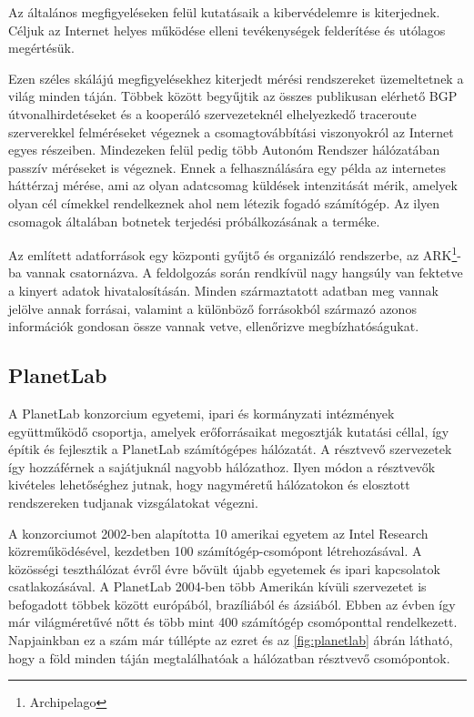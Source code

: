Az általános megfigyeléseken felül kutatásaik a kibervédelemre is kiterjednek. Céljuk az Internet helyes működése elleni tevékenységek felderítése és utólagos megértésük.


Ezen széles skálájú megfigyelésekhez kiterjedt mérési rendszereket üzemeltetnek a világ minden táján. Többek között begyűjtik az összes publikusan elérhető BGP útvonalhirdetéseket és a kooperáló szervezeteknél elhelyezkedő traceroute szerverekkel felméréseket végeznek a csomagtovábbítási viszonyokról az Internet egyes részeiben. Mindezeken felül pedig több Autonóm Rendszer hálózatában passzív méréseket is végeznek. Ennek a felhasználására egy példa az internetes háttérzaj mérése, ami az olyan adatcsomag küldések intenzitását mérik, amelyek olyan cél címekkel rendelkeznek ahol nem létezik fogadó számítógép. Az ilyen csomagok általában botnetek terjedési próbálkozásának a terméke.

Az említett adatforrások egy központi gyűjtő és organizáló rendszerbe, az ARK\footnote{Archipelago}-ba vannak csatornázva. A feldolgozás során rendkívül nagy hangsúly van fektetve a kinyert adatok hivatalosításán. Minden származtatott adatban meg vannak jelölve annak forrásai, valamint a különböző forrásokból származó azonos információk gondosan össze vannak vetve, ellenőrizve megbízhatóságukat.





\subsection{PlanetLab}

A PlanetLab konzorcium egyetemi, ipari és kormányzati intézmények együttműködő csoportja, amelyek erőforrásaikat megosztják kutatási céllal, így építik és fejlesztik a PlanetLab számítógépes hálózatát. A résztvevő szervezetek így hozzáférnek a sajátjuknál nagyobb hálózathoz. Ilyen módon a résztvevők kivételes lehetőséghez jutnak, hogy  nagyméretű hálózatokon és elosztott rendszereken tudjanak vizsgálatokat végezni.

A konzorciumot 2002-ben alapította 10 amerikai egyetem az Intel Research közreműködésével, kezdetben 100 számítógép-csomópont létrehozásával. A közösségi teszthálózat évről évre bővült újabb egyetemek és ipari kapcsolatok csatlakozásával. A PlanetLab 2004-ben több Amerikán kívüli szervezetet is befogadott többek között európából, brazíliából és ázsiából. Ebben az évben így már világméretűvé nőtt és több mint 400 számítógép csomóponttal rendelkezett. Napjainkban ez a szám már túllépte az ezret és az \ref{fig:planetlab} ábrán látható, hogy a föld minden táján megtalálhatóak a hálózatban résztvevő csomópontok.

